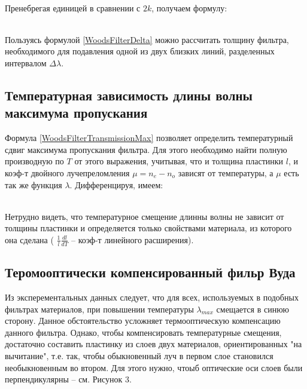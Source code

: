  \\

Пренебрегая единицей в сравнении с $ 2k $, получаем формулу:

 \\

Пользуясь формулой \ref{WoodsFilterDelta} можно рассчитать толщину фильтра, необходимого
для подавления одной из двух близких линий, разделенных интервалом $ \Delta\lambda $.

\newpage

\subsection{Температурная зависимость длины волны максимума пропускания}

Формула \ref{WoodsFilterTransmissionMax} позволяет определить температурный сдвиг
максимума пропускания фильтра. Для этого необходимо найти полную производную по $ T $
от этого выражения, учитывая, что и толщина пластинки $ l $, и коэф-т двойного
лучепреломления $ \mu = n_e - n_o $ зависят от температуры, а $ \mu $ есть так же
функция $ \lambda $. Дифференцируя, имеем:

 \\

Нетрудно видеть, что температурное смещение длинны волны не зависит от толщины пластинки
и определяется только свойствами материала, из которого она сделана (
$ \frac{1}{l} \frac{dl}{dT} $ -- коэф-т линейного расширения).

\subsection{Теромооптически компенсированный фильр Вуда}

Из эксперементальных данных следует, что для всех, используемых в подобных фильтрах
материалов, при повышении температуры $ \lambda_{max} $ смещается в синюю сторону.
Данное обстоятельство усложняет термооптическую компенсацию данного фильтра.
Однако, чтобы компенсировать температурные смещения, достаточно составить пластинку из
слоев двух материалов, ориентированных "на вычитание", т.е. так, чтобы обыкновенный
луч в первом слое становился необыкновенным во втором. Для этого нужно, чтоыб оптические
оси слоев были перпендикулярны -- см. Рисунок 3.

